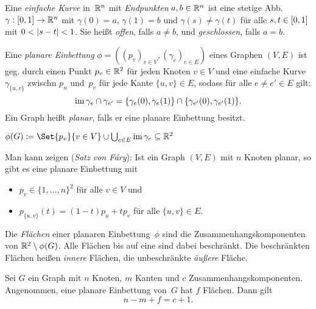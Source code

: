 \documentclass{cheat-sheet}
\newcommand{\Youtube}[1]{\href{https://www.youtube.com/watch?v=#1}{\textcolor{YoutubeColor}{$\blacktriangleright$}}}
\begin{document}
\begin{defn}
  Eine \emph{einfache Kurve} in~$\mathbb{R}^n$ mit \textit{Endpunkten} $a, b \in \mathbb{R}^n$ ist eine stetige Abb. $\gamma : \left[ 0, 1 \right] \to \mathbb{R}^n$ mit $\gamma(0) = a$, $\gamma(1) = b$ und $\gamma(s) \neq \gamma(t)$ für alle $s, t \in \left[ 0, 1 \right]$ mit $0 < \lvert s - t\rvert < 1$.
  Sie heißt \emph{offen}, falls $a \neq b$, und \emph{geschlossen}, falls $a = b$.
\end{defn}

\begin{defn}[\Youtube{wnYtITkWAYA}]
  Eine \emph{planare Einbettung} $\phi = ((p_v)_{v \in V}, (\gamma_e)_{e \in E})$ eines Graphen $(V, E)$ ist geg. durch einen Punkt $p_v \in \mathbb{R}^2$ für jeden Knoten $v \in V$ und eine einfache Kurve $\gamma_{\{ u, v \}}$ zwischn $p_u$ und~$p_v$ für jede Kante $\{ u, v \} \in E$, sodass für alle $e \neq e' \in E$ gilt:
  \[
    \operatorname{im} \gamma_e \cap \gamma_{e'} = \{ \gamma_e(0), \gamma_e(1) \} \cap \{ \gamma_{e'}(0), \gamma_{e'}(1) \}.
  \]
  Ein Graph heißt \emph{planar}, falls er eine planare Einbettung besitzt.
\end{defn}

\begin{nota}
  $\phi(G) \coloneqq \Set{p_v}{v \in V} \cup {\bigcup}_{e \in E} \im \gamma_e \subseteq \R^2$
\end{nota}

\begin{bem}
  Man kann zeigen (\textit{Satz von Fáry}): Ist ein Graph $(V, E)$ mit $n$ Knoten planar, so gibt es eine planare Einbettung mit
  \begin{itemize}
    \item $p_v \in \{1, \ldots, n\}^2$ für alle $v \in V$ und
    \item $p_{\{u, v\}}(t) = (1-t) p_u + t p_v$ für alle $\{u, v\} \in E$.
  \end{itemize}
\end{bem}

\begin{defn}
  Die \emph{Flächen} einer planaren Einbettung~$\phi$ sind die Zusammenhangskomponenten von $\mathbb{R}^2 \setminus \phi(G)$.
  Alle Flächen bis auf eine sind dabei beschränkt.
  Die beschränkten Flächen heißen \textit{innere} Flächen, die unbeschränkte \textit{äußere} Fläche.
\end{defn}

\begin{satz}[\emph{Euler-Formel}, \Youtube{5ywif1Zpeo4}]
  Sei $G$ ein Graph mit $n$ Knoten, $m$ Kanten und $c$ Zusammenhangskomponenten.
  Angenommen, eine planare Einbettung von~$G$ hat $f$ Flächen.
  Dann gilt
  \[ n - m + f = c + 1. \]
\end{satz}
\end{document}
